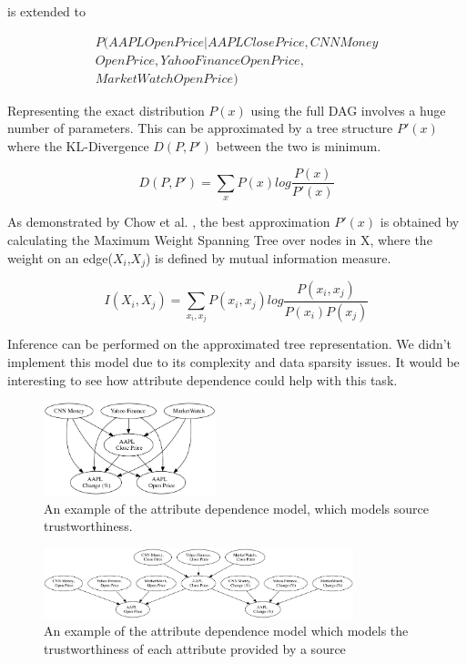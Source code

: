 \documentclass{acm_proc_article-sp}
\begin{document}
is extended to 

\begin{align}
P(AAPL Open Price|AAPL Close Price, CNN Money \nonumber  
\\Open Price,Yahoo Finance Open Price, \nonumber  
\\Market Watch Open Price) 
\end{align}

Representing the exact distribution $P(x)$ using the full DAG involves a huge number of parameters. This can be approximated by a tree structure $P'(x)$ where the KL-Divergence $D(P,P')$ between the two is minimum.  

\begin{equation}
D(P,P') = \sum_x P(x) log \frac{P(x)}{P'(x)}
\end{equation}

As demonstrated by Chow et al. \cite{chow1968approximating}, the best approximation $P'(x)$ is obtained by calculating the Maximum Weight Spanning Tree over nodes in X, where the weight on an edge($X_i$,$X_j$) is  defined by mutual information measure. 

\begin{equation}
I(X_i,X_j) = \sum_{x_i,x_j} P(x_i,x_j) log\frac{P(x_i,x_j)}{P(x_i) P(x_j)}
\end{equation}

Inference can be performed on the approximated tree representation. We didn't implement this model due to its complexity and data sparsity issues. It would be interesting to see how attribute dependence could help with this task.

\begin{figure}
\centering
\includegraphics[width=5cm]{bn1.png}
\caption{An example of the attribute dependence model, which models source trustworthiness.}
\label{fig:sourcet}
\end{figure}

\begin{figure}
\centering
\includegraphics[width=9cm]{bn2.png}
\caption{An example of the attribute dependence model which models the trustworthiness of each attribute provided by a source}
\label{fig:attrt}
\end{figure}
\end{document}
